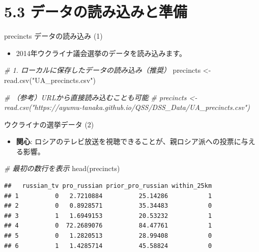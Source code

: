 \documentclass[
  ignorenonframetext,
]{beamer}
\newenvironment{Shaded}{\begin{snugshade}}{\end{snugshade}}
\newcommand{\CommentTok}[1]{\textcolor[rgb]{0.56,0.35,0.01}{\textit{#1}}}
\newcommand{\FunctionTok}[1]{\textcolor[rgb]{0.00,0.00,0.00}{#1}}
\newcommand{\NormalTok}[1]{#1}
\newcommand{\OtherTok}[1]{\textcolor[rgb]{0.56,0.35,0.01}{#1}}
\newcommand{\StringTok}[1]{\textcolor[rgb]{0.31,0.60,0.02}{#1}}
\providecommand{\tightlist}{%
  \setlength{\itemsep}{0pt}\setlength{\parskip}{0pt}}
\begin{document}
\hypertarget{ux30c7ux30fcux30bfux306eux8aadux307fux8fbcux307fux3068ux6e96ux5099}{%
\section{5.3
データの読み込みと準備}\label{ux30c7ux30fcux30bfux306eux8aadux307fux8fbcux307fux3068ux6e96ux5099}}

\begin{frame}[fragile]{precincts データの読み込み (1)}
\protect\hypertarget{precincts-ux30c7ux30fcux30bfux306eux8aadux307fux8fbcux307f-1}{}
\begin{itemize}
\tightlist
\item
  2014年ウクライナ議会選挙のデータを読み込みます。
\end{itemize}

\scriptsize

\begin{Shaded}
\begin{Highlighting}[]
\CommentTok{\# 1. ローカルに保存したデータの読み込み（推奨）}
\NormalTok{precincts }\OtherTok{\textless{}{-}} \FunctionTok{read.csv}\NormalTok{(}\StringTok{"UA\_precincts.csv"}\NormalTok{)}

\CommentTok{\# （参考）URLから直接読み込むことも可能}
\CommentTok{\# precincts \textless{}{-} read.csv("https://ayumu{-}tanaka.github.io/QSS/DSS\_Data/UA\_precincts.csv")}
\end{Highlighting}
\end{Shaded}

\normalsize
\end{frame}

\begin{frame}[fragile]{ウクライナの選挙データ (2)}
\protect\hypertarget{ux30a6ux30afux30e9ux30a4ux30caux306eux9078ux6319ux30c7ux30fcux30bf-2}{}
\begin{itemize}
\tightlist
\item
  \textbf{関心}:
  ロシアのテレビ放送を視聴できることが、親ロシア派への投票に与える影響。
\end{itemize}

\scriptsize

\begin{Shaded}
\begin{Highlighting}[]
\CommentTok{\# 最初の数行を表示}
\FunctionTok{head}\NormalTok{(precincts)}
\end{Highlighting}
\end{Shaded}

\begin{verbatim}
##   russian_tv pro_russian prior_pro_russian within_25km
## 1          0   2.7210884          25.14286           1
## 2          0   0.8928571          35.34483           0
## 3          1   1.6949153          20.53232           1
## 4          0  72.2689076          84.47761           1
## 5          0   1.2820513          28.99408           0
## 6          1   1.4285714          45.58824           0
\end{verbatim}

\normalsize
\end{frame}
\end{document}
